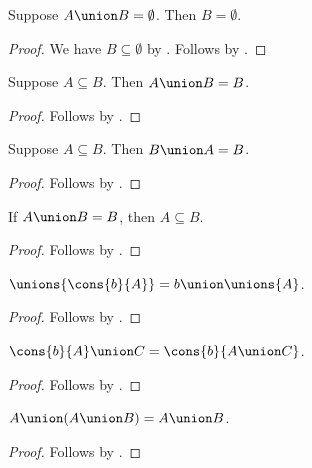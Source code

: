 \begin{proposition}%
\label{union_emptyset_elim_right}
    Suppose $A\union B = \emptyset$. Then $B = \emptyset$.
\end{proposition}
\begin{proof}
    We have $B\subseteq\emptyset$ by .
    Follows by .
\end{proof}

\begin{proposition}%
\label{union_absorb_subseteq_left}
    Suppose $A\subseteq B$. Then $A\union B = B$.
\end{proposition}
\begin{proof}
    Follows by .
\end{proof}

\begin{proposition}%
\label{union_absorb_subseteq_right}
    Suppose $A\subseteq B$. Then $B\union A = B$.
\end{proposition}
\begin{proof}
    Follows by .
\end{proof}

\begin{proposition}%
\label{union_eq_self_implies_subseteq}
    If $A\union B = B$, then $A\subseteq B$.
\end{proposition}
\begin{proof}
    Follows by .
\end{proof}

\begin{proposition}\label{unions_cons}
    $\unions{\cons{b}{A}} = b\union\unions{A}$.
\end{proposition}
\begin{proof}
    Follows by .
\end{proof}

\begin{proposition}\label{union_cons}
    $\cons{b}{A} \union C = \cons{b}{A\union C}$.
\end{proposition}
\begin{proof}
    Follows by .
\end{proof}

\begin{proposition}\label{union_absorb_left}
    $A\union (A\union B) = A\union B$.
\end{proposition}
\begin{proof}
    Follows by .
\end{proof}

